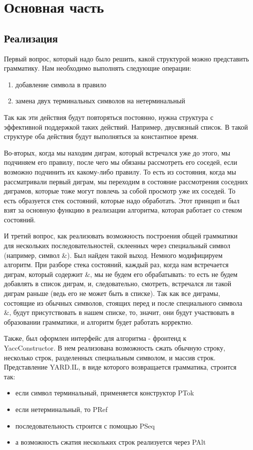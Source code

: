\documentclass[14pt]{matmex-diploma}
\begin{document}
\section{Основная часть}

    \subsection{Реализация}
    Первый вопрос, который надо было решить, какой структурой можно представить грамматику.
Нам необходимо выполнять следующие операции:
\begin{enumerate}
    \item добавление символа в правило
    \item замена двух терминальных символов на нетерминальный
\end{enumerate}
Так как эти действия будут повторяться постоянно, нужна структура с эффективной поддержкой таких действий. Например, двусвязный список. В такой структуре оба действия будут выполняться за константное время.

Во-вторых, когда мы находим диграм, который встречался уже до этого, мы подчиняем его правилу, после чего мы обязаны рассмотреть его соседей, если возможно подчинить их какому-либо правилу. То есть из состояния, когда мы рассматривали первый диграм, мы переходим в состояние рассмотрения соседних диграмов, которые тоже могут повлечь за собой просмотр уже их соседей. То есть образуется стек состояний, которые надо обработать. Этот принцип и был взят за основную функцию в реализации алгоритма, которая работает со стеком состояний.

И третий вопрос, как реализовать возможность построения общей грамматики для нескольких последовательностей, склеенных через специальный символ (например, символ \&). Был найден такой выход.  Немного модифицируем алгоритм.
При разборе стека состояний, каждый раз, когда нам встречается диграм, который содержит \&, мы не будем его обрабатывать: то есть не будем добавлять в список диграм, и, следовательно, смотреть, встречался ли такой диграм раньше (ведь его не может быть в списке). 
Так как все диграмы, состоящие из обычных символов, стоящих перед и после специального символа \&, будут присутствовать в нашем списке, то, значит, они будут участвовать в образовании грамматики, и алгоритм будет работать корректно.

Также, был оформлен интерфейс для алгоритма - фронтенд к \\YaccConstructor. В нем реализована возможность сжать обычную строку, несколько строк, разделенных специальным символом, и массив строк. Представление YARD.IL, в виде которого возвращается грамматика, строится так:
\begin{itemize}
    \item если символ терминальный, применяется конструктор PTok
    \item если нетерминальный, то PRef
    \item последовательность строится с помощью PSeq
    \item а возможность сжатия нескольких строк реализуется через PAlt
\end{itemize}
\end{document}
